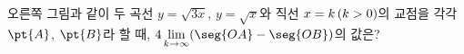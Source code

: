 \noindent\begin{minipage}[t]{0.58\linewidth}\vspace{0pt}\raggedright 오른쪽 그림과 같이 두 곡선 $y=\sqrt{3x}$, $y=\sqrt{x}$와 직선 $x=k\mkern3mu (k>0)$의 교점을 각각 $\pt{A}$, $\pt{B}$라 할 때, $4\displaystyle\lim_{k\to\infty}(\seg{OA}-\seg{OB})$의 값은? \end{minipage}\hfill\begin{minipage}[t]{0.4\linewidth}\vspace{0pt}\centering \resizebox{\ifdim\width>\linewidth\linewidth\else\width\fi}{!}{}\end{minipage}\par
{}
